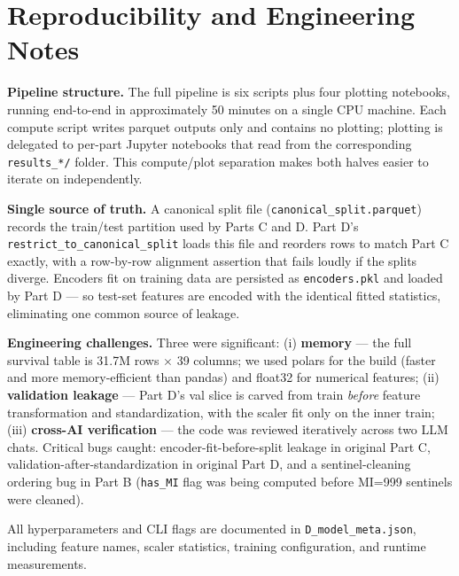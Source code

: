 \documentclass[11pt,a4paper]{article}
\begin{document}
\section{Reproducibility and Engineering Notes}

\textbf{Pipeline structure.} The full pipeline is six scripts plus four plotting notebooks, running end-to-end in approximately 50 minutes on a single CPU machine. Each compute script writes parquet outputs only and contains no plotting; plotting is delegated to per-part Jupyter notebooks that read from the corresponding \texttt{results\_*/} folder. This compute/plot separation makes both halves easier to iterate on independently.

\textbf{Single source of truth.} A canonical split file (\texttt{canonical\_split.parquet}) records the train/test partition used by Parts C and D. Part D's \texttt{restrict\_to\_canonical\_split} loads this file and reorders rows to match Part C exactly, with a row-by-row alignment assertion that fails loudly if the splits diverge. Encoders fit on training data are persisted as \texttt{encoders.pkl} and loaded by Part D --- so test-set features are encoded with the identical fitted statistics, eliminating one common source of leakage.

\textbf{Engineering challenges.} Three were significant: (i) \textbf{memory} --- the full survival table is 31.7M rows $\times$ 39 columns; we used polars for the build (faster and more memory-efficient than pandas) and float32 for numerical features; (ii) \textbf{validation leakage} --- Part D's val slice is carved from train \emph{before} feature transformation and standardization, with the scaler fit only on the inner train; (iii) \textbf{cross-AI verification} --- the code was reviewed iteratively across two LLM chats. Critical bugs caught: encoder-fit-before-split leakage in original Part C, validation-after-standardization in original Part D, and a sentinel-cleaning ordering bug in Part B (\texttt{has\_MI} flag was being computed before MI=999 sentinels were cleaned).

All hyperparameters and CLI flags are documented in \texttt{D\_model\_meta.json}, including feature names, scaler statistics, training configuration, and runtime measurements.
\end{document}
